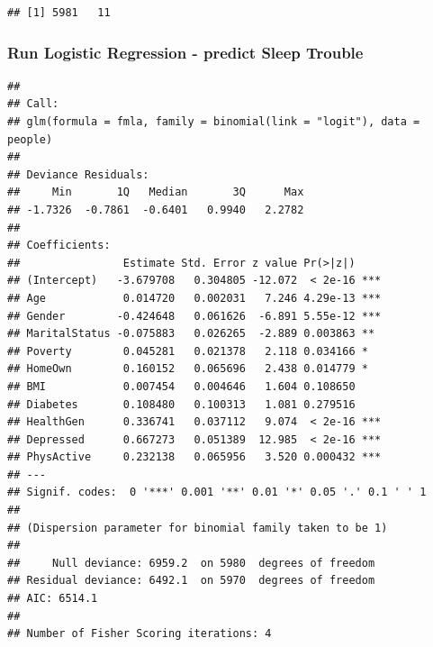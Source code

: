 \documentclass[]{article}
\newenvironment{Shaded}{\begin{snugshade}}{\end{snugshade}}
\newcommand{\KeywordTok}[1]{\textcolor[rgb]{0.13,0.29,0.53}{\textbf{{#1}}}}
\newcommand{\DataTypeTok}[1]{\textcolor[rgb]{0.13,0.29,0.53}{{#1}}}
\newcommand{\DecValTok}[1]{\textcolor[rgb]{0.00,0.00,0.81}{{#1}}}
\newcommand{\StringTok}[1]{\textcolor[rgb]{0.31,0.60,0.02}{{#1}}}
\newcommand{\CommentTok}[1]{\textcolor[rgb]{0.56,0.35,0.01}{\textit{{#1}}}}
\newcommand{\NormalTok}[1]{{#1}}
\begin{document}
\begin{verbatim}
## [1] 5981   11
\end{verbatim}

\subsubsection{Run Logistic Regression - predict Sleep
Trouble}\label{run-logistic-regression---predict-sleep-trouble}

\begin{Shaded}
\end{Shaded}

\begin{verbatim}
## 
## Call:
## glm(formula = fmla, family = binomial(link = "logit"), data = people)
## 
## Deviance Residuals: 
##     Min       1Q   Median       3Q      Max  
## -1.7326  -0.7861  -0.6401   0.9940   2.2782  
## 
## Coefficients:
##                Estimate Std. Error z value Pr(>|z|)    
## (Intercept)   -3.679708   0.304805 -12.072  < 2e-16 ***
## Age            0.014720   0.002031   7.246 4.29e-13 ***
## Gender        -0.424648   0.061626  -6.891 5.55e-12 ***
## MaritalStatus -0.075883   0.026265  -2.889 0.003863 ** 
## Poverty        0.045281   0.021378   2.118 0.034166 *  
## HomeOwn        0.160152   0.065696   2.438 0.014779 *  
## BMI            0.007454   0.004646   1.604 0.108650    
## Diabetes       0.108480   0.100313   1.081 0.279516    
## HealthGen      0.336741   0.037112   9.074  < 2e-16 ***
## Depressed      0.667273   0.051389  12.985  < 2e-16 ***
## PhysActive     0.232138   0.065956   3.520 0.000432 ***
## ---
## Signif. codes:  0 '***' 0.001 '**' 0.01 '*' 0.05 '.' 0.1 ' ' 1
## 
## (Dispersion parameter for binomial family taken to be 1)
## 
##     Null deviance: 6959.2  on 5980  degrees of freedom
## Residual deviance: 6492.1  on 5970  degrees of freedom
## AIC: 6514.1
## 
## Number of Fisher Scoring iterations: 4
\end{verbatim}
\end{document}
